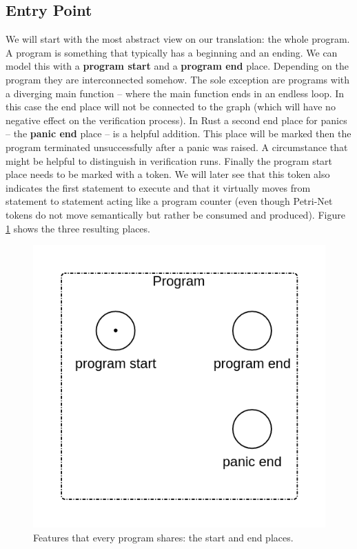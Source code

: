 \subsection{Entry Point}
We will start with the most abstract view on our translation: the whole program.
A program is something that typically has a beginning and an ending.
We can model this with a \textbf{program start} and a \textbf{program end} place.
Depending on the program they are interconnected somehow.
The sole exception are programs with a diverging main function -- where the main function ends in an endless loop.
In this case the end place will not be connected to the graph (which will have no negative effect on the verification process).
In Rust a second end place for panics -- the \textbf{panic end} place -- is a helpful addition.
This place will be marked then the program terminated unsuccessfully after a panic was raised.
A circumstance that might be helpful to distinguish in verification runs.
Finally the program start place needs to be marked with a token.
We will later see that this token also indicates the first statement to execute and that it virtually moves from statement to statement acting like a program counter (even though Petri-Net tokens do not move semantically but rather be consumed and produced).
Figure \ref{program_stub} shows the three resulting places.
\begin{figure}
    \centering
    \includegraphics[width=.4\textwidth]{../diagrams/basic_program_new.png}
    \caption{
        Features that every program shares: the start and end places.
    }
    \label{program_stub}
\end{figure}

